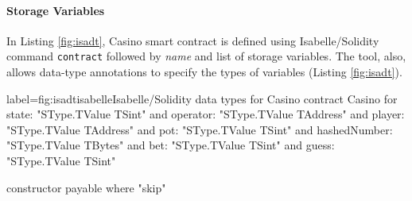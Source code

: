\documentclass[a4paper,UKenglish,cleveref, autoref, thm-restate]{oasics-v2021}
\begin{document}
\paragraph*{Storage Variables}
%
%
In Listing \ref{fig:isadt}, Casino smart contract is defined using Isabelle/Solidity command \texttt{\color{isacom}contract} followed by \emph{name} and list of storage variables.
%
The tool, also,  allows data-type annotations to specify the types of variables (Listing \ref{fig:isadt}).
\begin{code}{label={fig:isadt}}{isabelle}{Isabelle/Solidity data types for Casino}
contract Casino
  for state: "SType.TValue TSint"
  and operator: "SType.TValue TAddress"
  and player: "SType.TValue TAddress"
  and pot: "SType.TValue TSint"
  and hashedNumber: "SType.TValue TBytes"
  and bet: "SType.TValue TSint"
  and guess: "SType.TValue TSint"

constructor payable
where
  "skip"
\end{code}
%
%	
%
\end{document}
